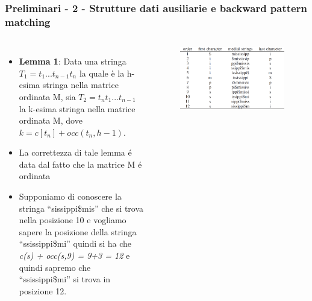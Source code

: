 \documentclass{beamer}
\begin{document}
\begin{frame}
\frametitle{Preliminari - 2 - Strutture dati ausiliarie e backward pattern matching}
\begin{columns}
	\begin{itemize}
		\item \textbf{Lemma 1}: Data una stringa $ T_{1}=t_{1}...t_{n-1}t_{n}$  la quale è la h-esima stringa nella matrice ordinata M, sia $ T_{2} = t_{n}t_{1}...t_{n-1} $ la k-esima stringa nella matrice ordinata M, dove $ k = c[t_{n}] + occ(t_{n},h-1). $
		\item La correttezza di tale lemma é data dal fatto che la matrice M é ordinata
		\item Supponiamo di conoscere la stringa  ``sissippi\$mis'' che si trova nella posizione 10 e vogliamo sapere la posizione della stringa ``ssissippi\$mi'' quindi si ha che \\ \textit{c(s) + occ(s,9) = 9+3 = 12} e quindi sapremo che  ``ssissippi\$mi'' si trova in posizione 12.
	\end{itemize}
	\begin{figure}[H]
		\centering
		\includegraphics[scale=0.15]{Immagini/BWTExample}
	\end{figure}
\end{columns}
\end{frame}
\end{document}
